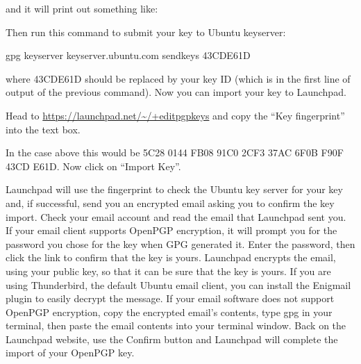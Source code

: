 \documentclass[letterpaper,10pt,english]{sphinxmanual}
\begin{document}
and it will print out something like:

\begin{sphinxVerbatim}[commandchars=\\\{\}]
    
                   
     
    
\end{sphinxVerbatim}

Then run this command to submit your key to Ubuntu keyserver:

\begin{sphinxVerbatim}[commandchars=\\\{\}]
\PYGZdl{} gpg \PYGZhy{}\PYGZhy{}keyserver keyserver.ubuntu.com \PYGZhy{}\PYGZhy{}send\PYGZhy{}keys 43CDE61D
\end{sphinxVerbatim}

where 43CDE61D should be replaced by your key ID (which is in the first line of output of the previous command). Now you can import your key to Launchpad.

Head to \url{https://launchpad.net/~/+editpgpkeys} and copy the “Key fingerprint” into the text box.

In the case above this would be 5C28 0144 FB08 91C0 2CF3  37AC 6F0B F90F 43CD E61D.
Now click on “Import Key”.

Launchpad will use the fingerprint to check the Ubuntu key server for your key and, if successful, send you an encrypted email asking you to confirm the key import. Check your email account and read the email that Launchpad sent you. If your email client supports OpenPGP encryption, it will prompt you for the password you chose for the key when GPG generated it. Enter the password, then click the link to confirm that the key is yours.
Launchpad encrypts the email, using your public key, so that it can be sure that the key is yours. If you are using Thunderbird, the default Ubuntu email client, you can install the Enigmail plugin to easily decrypt the message. If your email software does not support OpenPGP encryption, copy the encrypted email’s contents, type gpg in your terminal, then paste the email contents into your terminal window.
Back on the Launchpad website, use the Confirm button and Launchpad will complete the import of your OpenPGP key.
\end{document}
